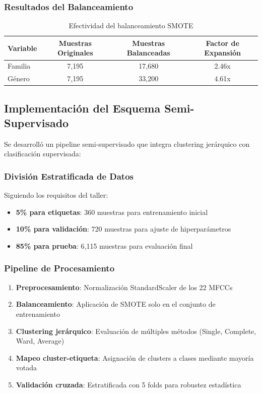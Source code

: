 \documentclass[12pt,a4paper]{article}
\begin{document}
\subsubsection{Resultados del Balanceamiento}
\begin{table}[H]
\centering
\begin{tabular}{|l|c|c|c|}
\hline
\textbf{Variable} & \textbf{Muestras Originales} & \textbf{Muestras Balanceadas} & \textbf{Factor de Expansión} \\
\hline
Familia & 7,195 & 17,680 & 2.46x \\
Género & 7,195 & 33,200 & 4.61x \\
\hline
\end{tabular}
\caption{Efectividad del balanceamiento SMOTE}
\end{table}

\subsection{Implementación del Esquema Semi-Supervisado}
Se desarrolló un pipeline semi-supervisado que integra clustering jerárquico con clasificación supervisada:

\subsubsection{División Estratificada de Datos}
Siguiendo los requisitos del taller:
\begin{itemize}
    \item \textbf{5\% para etiquetas}: 360 muestras para entrenamiento inicial
    \item \textbf{10\% para validación}: 720 muestras para ajuste de hiperparámetros
    \item \textbf{85\% para prueba}: 6,115 muestras para evaluación final
\end{itemize}

\subsubsection{Pipeline de Procesamiento}
\begin{enumerate}
    \item \textbf{Preprocesamiento}: Normalización StandardScaler de los 22 MFCCs
    \item \textbf{Balanceamiento}: Aplicación de SMOTE solo en el conjunto de entrenamiento
    \item \textbf{Clustering jerárquico}: Evaluación de múltiples métodos (Single, Complete, Ward, Average)
    \item \textbf{Mapeo cluster-etiqueta}: Asignación de clusters a clases mediante mayoría votada
    \item \textbf{Validación cruzada}: Estratificada con 5 folds para robustez estadística
\end{enumerate}
\end{document}
